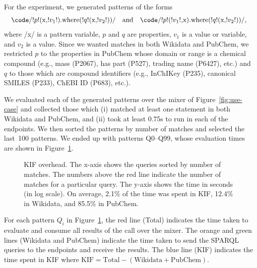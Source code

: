 For the experiment, we generated patterns of the forms
\[
  \text{\code/!$p$!(x,!$v_1$!).where(!$q$!(x,!$v_2$!))/}
  \quad\text{and}\quad
  \text{\code/!$p$!(!$v_1$!,x).where(!$q$!(x,!$v_2$!))/},
\]
where \code/x/ is a pattern variable, $p$ and $q$ are properties, $v_1$ is a value or variable, and $v_2$ is a value.
Since we wanted matches in both Wikidata and PubChem, we restricted $p$ to the properties in PubChem whose domain or range is a chemical compound (e.g., mass (P2067), has part (P527), trading name (P6427), etc.) and $q$ to those which are compound identifiers (e.g., InChIKey (P235), canonical SMILES (P233), ChEBI ID (P683), etc.).


We evaluated each of the generated patterns over the mixer of Figure~\ref{fig:use-case} and collected those which (i) matched at least one statement in both Wikidata and PubChem, and (ii) took at least 0.75s to run in each of the endpoints.
We then sorted the patterns by number of matches and selected the last~100 patterns.
We ended up with patterns Q0--Q99, whose evaluation times are shown in Figure~\ref{fig:plot}.


\begin{figure}[ht]
  \centering
  \caption{%
    KIF overhead.
    The x-axis shows the queries sorted by number of matches.
    The numbers above the red line indicate the number of matches for a particular query.
    The y-axis shows the time in seconds (in log scale).
    On average, 2.1\% of the time was spent in KIF, 12.4\% in Wikidata, and 85.5\% in PubChem.}%
  \label{fig:plot}
\end{figure}


For each pattern $Q_i$ in Figure~\ref{fig:plot}, the red line (Total) indicates the time taken to evaluate and consume all results of the call  over the mixer.
The orange and green lines (Wikidata and PubChem) indicate the time taken to send the SPARQL queries to the endpoints and receive the results.
The blue line (KIF) indicates the time spent in KIF where $\text{KIF}=\text{Total}-(\text{Wikidata}+\text{PubChem})$.


